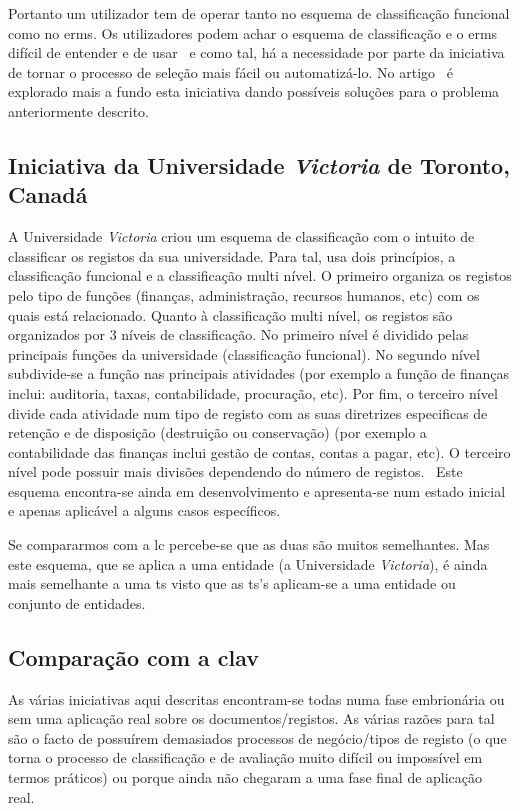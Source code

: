 Portanto um utilizador tem de operar tanto no esquema de classificação funcional como no \acrshort{erms}. Os utilizadores podem achar o esquema de classificação e o \acrshort{erms} difícil de entender e de usar~\cite{finInit} e como tal, há a necessidade por parte da iniciativa de tornar o processo de seleção mais fácil ou automatizá-lo. No artigo~\cite{finInit} é explorado mais a fundo esta iniciativa dando possíveis soluções para o problema anteriormente descrito.

\subsection{Iniciativa da Universidade \textit{Victoria} de Toronto, Canadá}

A Universidade \textit{Victoria} criou um esquema de classificação com o intuito de classificar os registos da sua universidade. Para tal, usa dois princípios, a classificação funcional e a classificação multi nível. O primeiro organiza os registos pelo tipo de funções (finanças, administração, recursos humanos, etc) com os quais está relacionado. Quanto à classificação multi nível, os registos são organizados por 3 níveis de classificação. No primeiro nível é dividido pelas principais funções da universidade (classificação funcional). No segundo nível subdivide-se a função nas principais atividades (por exemplo a função de finanças inclui: auditoria, taxas, contabilidade, procuração, etc). Por fim, o terceiro nível divide cada atividade num tipo de registo com as suas diretrizes especificas de retenção e de disposição (destruição ou conservação) (por exemplo a contabilidade das finanças inclui gestão de contas, contas a pagar, etc). O terceiro nível pode possuir mais divisões dependendo do número de registos.~\cite{uniInit} Este esquema encontra-se ainda em desenvolvimento e apresenta-se num estado inicial e apenas aplicável a alguns casos específicos.

Se compararmos com a \acrshort{lc} percebe-se que as duas são muitos semelhantes. Mas este esquema, que se aplica a uma entidade (a Universidade \textit{Victoria}), é ainda mais semelhante a uma \acrshort{ts} visto que as \acrshort{ts}'s aplicam-se a uma entidade ou conjunto de entidades.

\subsection{Comparação com a \acrshort{clav}}

As várias iniciativas aqui descritas encontram-se todas numa fase embrionária ou sem uma aplicação real sobre os documentos/registos. As várias razões para tal são o facto de possuírem demasiados processos de negócio/tipos de registo (o que torna o processo de classificação e de avaliação muito difícil ou impossível em termos práticos) ou porque ainda não chegaram a uma fase final de aplicação real.

